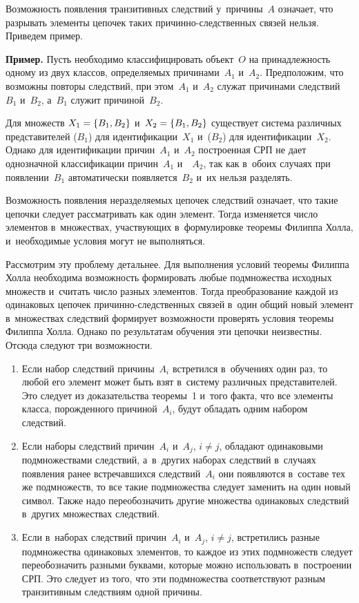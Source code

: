 \begin{multicols}{2}
  Возможность появления транзитивных следствий у~причины~$A$ означает, что 
разрывать элементы цепочек таких при\-чин\-но-след\-ст\-вен\-ных связей нельзя. 
Приведем пример.
  
  \textbf{Пример.} Пусть необходимо классифицировать объект~$O$ на 
при\-над\-леж\-ность одному из двух классов, опре\-де\-ля\-емых причинами~$A_1$ 
и~$A_2$. Предположим, что воз\-мож\-ны повторы следствий, при этом~$A_1$ 
и~$A_2$ служат причинами следствий~$B_1$ и~$B_2$, а~$B_1$ служит 
причиной~$B_2$.
  
   Для множеств $X_1\hm= \{B_1, B_2\}$ и~$X_2\hm=\{ B_1, B_2\}$ существует сис\-те\-ма раз\-лич\-ных 
пред\-ста\-ви\-те\-лей ($B_1$) для идентификации~$X_1$ и~($B_2$) для 
идентификации~$X_2$. Однако для идентификации причин~$A_1$ и~$A_2$ 
по\-стро\-ен\-ная СРП не дает однозначной классификации причин~$A_1$ и~~$A_2$, 
так как в~обоих случаях при появлении~$B_1$ автоматически появляется~$B_2$ и~их нельзя раз\-де\-лять.
  
  Возможность появления не\-раз\-де\-ля\-емых цепочек следствий означает, что такие 
цепочки следует рас\-смат\-ри\-вать как один элемент. Тогда изменяется чис\-ло 
элементов в~множествах, участ\-ву\-ющих в~формулировке тео\-ре\-мы Филиппа Холла, 
и~необходимые условия могут не выполняться.
  
  Рассмотрим эту проб\-ле\-му детальнее. Для выполнения условий тео\-ре\-мы 
Филиппа Холла необходима воз\-мож\-ность формировать любые подмножества 
исходных множеств и~считать чис\-ло разных элементов. Тогда преобразование 
каж\-дой из одинаковых цепочек при\-чин\-но-след\-ст\-вен\-ных связей в~один 
общий новый элемент в~множествах следствий формирует возможности 
проверять условия тео\-ре\-мы Филиппа Холла. Однако по результатам обуче\-ния эти 
цепочки неизвестны. Отсюда следуют три воз\-мож\-ности.
  \begin{enumerate}[1.]
  \item Если набор следствий причины~$A_i$ встретился в~обучениях один раз, 
то любой его элемент может быть взят в~сис\-те\-му различных пред\-ста\-ви\-те\-лей. Это 
следует из доказательства тео\-ре\-мы~1 и~того факта, что все элементы класса, 
по\-рож\-ден\-но\-го причиной~$A_i$, будут обладать одним набором следствий.
  \item Если наборы следствий причин~$A_i$ и~$A_j$, $i\not= j$, обладают 
одинаковыми подмножествами следствий, а~в~других наборах следствий 
в~случаях появления ранее встре\-чав\-ших\-ся следствий~$A_i$ они появляются 
в~со\-ста\-ве тех же подмножеств, то все такие подмножества следует заменить на 
один новый символ. Также надо переобозначить другие множества одинаковых 
следствий в~других множествах следствий.
  \item Если в~наборах следствий причин~$A_i$ и~$A_j$, $i\not= j$, встретились 
разные подмножества одинаковых элементов, то каж\-дое из этих подмножеств 
следует переобозначить раз\-ны\-ми буквами, которые мож\-но использовать 
в~по\-стро\-ении СРП. Это следует из того, что эти подмножества соответствуют 
разным транзитивным следствиям одной причины.
  \end{enumerate}
  

\end{multicols}
